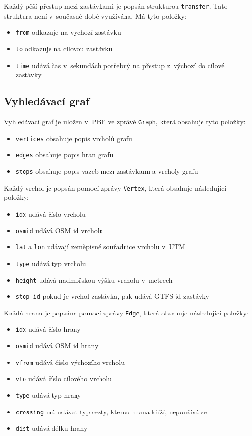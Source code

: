Každý pěší přestup mezi zastávkami je popsán strukturou {\tt transfer}. Tato
struktura není v~současné době využívána. Má tyto položky:
\begin{itemize}
	\item {\tt from} odkazuje na výchozí zastávku
	\item {\tt to} odkazuje na cílovou zastávku
	\item {\tt time} udává čas v~sekundách potřebný na přestup z~výchozí do
	cílové zastávky
\end{itemize}

\subsection{Vyhledávací graf}
Vyhledávací graf je uložen v~PBF ve zprávě {\tt Graph}, která obsahuje tyto
položky:
\begin{itemize}
	\item {\tt vertices} obsahuje popis vrcholů grafu
	\item {\tt edges} obsahuje popis hran grafu
	\item {\tt stops} obsahuje popis vazeb mezi zastávkami a vrcholy grafu 
\end{itemize} 
Každý vrchol je popsán pomocí zprávy {\tt Vertex}, která obsahuje následující
položky:
\begin{itemize}
	\item {\tt idx} udává číslo vrcholu
	\item {\tt osmid} udává OSM id vrcholu
	\item {\tt lat} a {\tt lon} udávají zeměpisné souřadnice vrcholu v~UTM
	\item {\tt type} udává typ vrcholu
	\item {\tt height} udává nadmořskou výšku vrcholu v~metrech
	\item {\tt stop\_id} pokud je vrchol zastávka, pak udává GTFS id
	zastávky 
\end{itemize} 
Každá hrana je popsána pomocí zprávy {\tt Edge}, která obsahuje následující
položky: 
\begin{itemize}
	\item {\tt idx} udává číslo hrany
	\item {\tt osmid} udává OSM id hrany
	\item {\tt vfrom} udává číslo výchozího vrcholu 
	\item {\tt vto} udává číslo cílového vrcholu
	\item {\tt type} udává typ hrany
	\item {\tt crossing} má udávat typ cesty, kterou hrana kříží, nepoužívá
	se
	\item {\tt dist} udává délku hrany
\end{itemize} 
